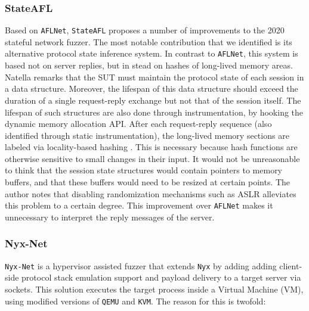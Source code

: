 \subsubsection{StateAFL}
\label{extend:netfuzz:survey:stateafl}

Based on \texttt{AFLNet}, \texttt{StateAFL} proposes a number of improvements to the 2020 stateful network fuzzer. The most notable contribution that we identified is its alternative protocol state inference system. In contrast to \texttt{AFLNet}, this system is based not on server replies, but in stead on hashes of long-lived memory areas. Natella remarks that the SUT must maintain the protocol state of each session in a data structure. Moreover, the lifespan of this data structure should exceed the duration of a single request-reply exchange but not that of the session itself. The lifespan of such structures are also done through instrumentation, by hooking the dynamic memory allocation API. After each request-reply sequence (also identified through static instrumentation), the long-lived memory sections are labeled via locality-based hashing \cite{jafari2021survey}. This is necessary because hash functions are otherwise sensitive to small changes in their input. It would not be unreasonable to think that the session state structures would contain pointers to memory buffers, and that these buffers would need to be resized at certain points. The author notes that disabling randomization mechanisms such as ASLR alleviates this problem to a certain degree. This improvement over \texttt{AFLNet} makes it unnecessary to interpret the reply messages of the server. 

\subsubsection{Nyx-Net}
\label{extend:netfuzz:survey:nyxnet}

\texttt{Nyx-Net} \cite{schumilo2022nyx} is a hypervisor assisted fuzzer that extends \texttt{Nyx} \cite{schumilo2021nyx} by adding adding client-side protocol stack emulation support and payload delivery to a target server via sockets. This solution executes the target process inside a Virtual Machine (VM), using modified versions of \texttt{QEMU} and \texttt{KVM}. The reason for this is twofold:

